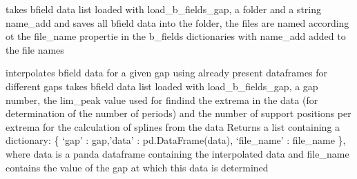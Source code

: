 \documentclass[letterpaper,10pt,english]{sphinxmanual}
\begin{document}
\begin{fulllineitems}
\label{\detokenize{autoapi/unduwave/helpers/bfield_helpers/index:unduwave.helpers.bfield_helpers.save_prepared_b_data}}
\pysigstartsignatures
{}
\pysigstopsignatures
\sphinxAtStartPar
takes b\sphinxhyphen{}field data list loaded with load\_b\_fields\_gap, a folder and a string name\_add
and saves all b\sphinxhyphen{}field data into the folder, the files are named according ot the
file\_name propertie in the b\_fields dictionaries with name\_add added to the file names

\end{fulllineitems}


\begin{fulllineitems}
\label{\detokenize{autoapi/unduwave/helpers/bfield_helpers/index:unduwave.helpers.bfield_helpers.interpolate_b_data}}
\pysigstartsignatures
{}
\pysigstopsignatures
\sphinxAtStartPar
interpolates b\sphinxhyphen{}field data for a given gap using already present dataframes for different gaps
takes b\sphinxhyphen{}field data list loaded with load\_b\_fields\_gap, a gap number, the lim\_peak value
used for findind the extrema in the data (for determination of the number of periods)
and the number of support positions per extrema for the calculation of splines from the data
Returns a list containing a dictionary: \{ ‘gap’ : gap,’data’ : pd.DataFrame(data), ‘file\_name’ : file\_name \}, where data is a panda dataframe
containing the interpolated data and file\_name contains the value of the gap at which this data is determined

\end{fulllineitems}
\end{document}
